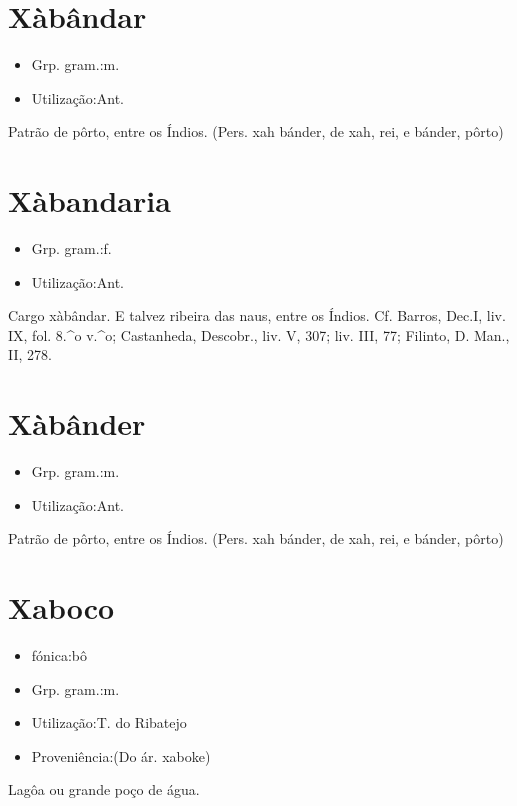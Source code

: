 \section{Xàbândar}
\begin{itemize}
\item {Grp. gram.:m.}
\end{itemize}
\begin{itemize}
\item {Utilização:Ant.}
\end{itemize}
Patrão de pôrto, entre os Índios.
(Pers. \textunderscore xah bánder\textunderscore , de \textunderscore xah\textunderscore , rei, e \textunderscore bánder\textunderscore , pôrto)
\section{Xàbandaria}
\begin{itemize}
\item {Grp. gram.:f.}
\end{itemize}
\begin{itemize}
\item {Utilização:Ant.}
\end{itemize}
Cargo xàbândar.
E talvez ribeira das naus, entre os Índios. Cf. Barros, \textunderscore Dec.\textunderscore  I, liv. IX, fol. 8.^o v.^o; Castanheda, \textunderscore Descobr.\textunderscore , liv. V, 307; liv. III, 77; Filinto, \textunderscore D. Man.\textunderscore , II, 278.
\section{Xàbânder}
\begin{itemize}
\item {Grp. gram.:m.}
\end{itemize}
\begin{itemize}
\item {Utilização:Ant.}
\end{itemize}
Patrão de pôrto, entre os Índios.
(Pers. \textunderscore xah bánder\textunderscore , de \textunderscore xah\textunderscore , rei, e \textunderscore bánder\textunderscore , pôrto)
\section{Xaboco}
\begin{itemize}
\item {fónica:bô}
\end{itemize}
\begin{itemize}
\item {Grp. gram.:m.}
\end{itemize}
\begin{itemize}
\item {Utilização:T. do Ribatejo}
\end{itemize}
\begin{itemize}
\item {Proveniência:(Do ár. \textunderscore xaboke\textunderscore )}
\end{itemize}
Lagôa ou grande poço de água.

